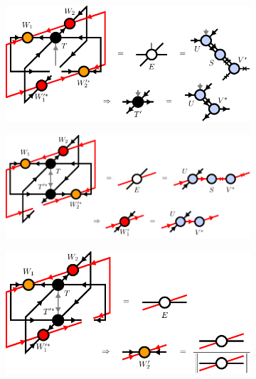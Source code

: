 \begin{figure}
	\centering
	\begin{subfigure}[c]{0.85\textwidth}
		\includegraphics[scale=1]{figures/tikz/disoTPS/yang_baxter_move_iterative/yang_baxter_move_iterative_b.pdf}
		\caption{}\label{fig:YB_move_iterate_polar_optimize_T}
	\end{subfigure}
	\begin{subfigure}[c]{0.85\textwidth}
		\includegraphics[scale=1]{figures/tikz/disoTPS/yang_baxter_move_iterative/yang_baxter_move_iterative_c.pdf}
		\caption{}\label{fig:YB_move_iterate_polar_optimize_W1}
	\end{subfigure}
	\begin{subfigure}[c]{0.85\textwidth}
		\includegraphics[scale=1]{figures/tikz/disoTPS/yang_baxter_move_iterative/yang_baxter_move_iterative_d.pdf}

\end{subfigure}
\end{figure}
